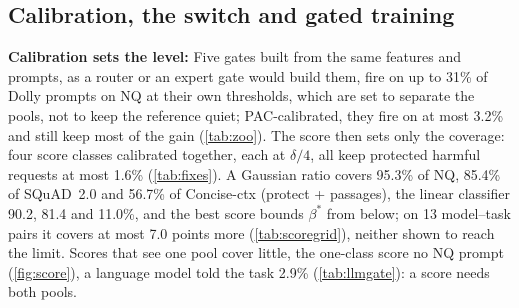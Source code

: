 \documentclass{article}
\theoremstyle{plain}
\theoremstyle{definition}
\theoremstyle{remark}
\begin{document}
\subsection{Calibration, the switch and gated training}
\label{sec:res-calib}

\textbf{Calibration sets the level:} Five gates built from the same features and prompts, as a router or an expert
gate \citep{aljundi2017expertgate} would build them, fire on up to 31\% of Dolly prompts on NQ at their own
thresholds, which are set to separate the pools, not to keep the reference quiet; PAC-calibrated, they fire on at
most 3.2\% and still keep most of the gain (\cref{tab:zoo}). The score then sets only the coverage: four score
classes calibrated together, each at $\delta/4$, all keep protected harmful requests at most 1.6\% (\cref{tab:fixes}).
A Gaussian ratio covers 95.3\% of NQ, 85.4\% of SQuAD~2.0 and 56.7\% of Concise-ctx (protect + passages), the linear
classifier 90.2, 81.4 and 11.0\%, and the best score bounds $\beta^\ast$ from below; on 13 model--task pairs it covers at
most 7.0 points more (\cref{tab:scoregrid}), neither shown to reach the limit. Scores that see one pool cover
little, the one-class score no NQ prompt (\cref{fig:score}), a language model told the task 2.9\% (\cref{tab:llmgate}): a score needs both pools.
\end{document}
